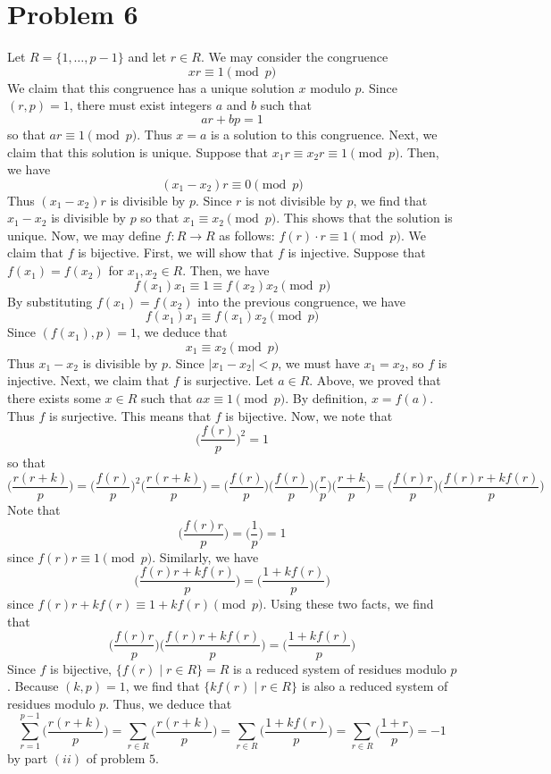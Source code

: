\documentclass[12pt]{article}
\begin{document}
\section*{Problem 6}
Let $R = \{1,\ldots, p - 1\}$ and let $r \in R$. We may consider the congruence
\[
xr \equiv 1 \pmod{p}
\] We claim that this congruence has a unique solution $x$ modulo $p$. Since $(r,p) = 1$, there must exist integers $a$ and $b$ such that
\[
ar + bp = 1
\] so that $ar \equiv 1 \pmod{p}$. Thus $x = a$ is a solution to this congruence. Next, we claim that this solution is unique. Suppose that $x_1r \equiv x_2r \equiv 1 \pmod{p}$. Then, we have
\[
(x_1-x_2)r \equiv 0 \pmod{p}
\] Thus $(x_1 - x_2)r$ is divisible by $p$. Since $r$ is not divisible by $p$, we find that $x_1 - x_2$ is divisible by $p$ so that $x_1 \equiv x_2 \pmod{p}$. This shows that the solution is unique. Now, we may define $f: R \rightarrow R$ as follows: $f(r) \cdot r \equiv 1 \pmod{p}$. We claim that $f$ is bijective. First, we will show that $f$ is injective. Suppose that $f(x_1) = f(x_2)$ for $x_1,x_2 \in R$. Then, we have
\[
f(x_1)x_1 \equiv 1 \equiv f(x_2)x_2 \pmod{p}
\] By substituting $f(x_1) = f(x_2)$ into the previous congruence, we have
\[
f(x_1)x_1 \equiv f(x_1)x_2 \pmod{p}
\] Since $(f(x_1), p) = 1$, we deduce that
\[
x_1 \equiv x_2 \pmod{p}
\] Thus $x_1 - x_2$ is divisible by $p$. Since $\vert x_1 - x_2 \vert < p$, we must have $x_1 = x_2$, so $f$ is injective. Next, we claim that $f$ is surjective. Let $a \in R$. Above, we proved that there exists some $x \in R$ such that $ax \equiv 1 \pmod{p}$. By definition, $x = f(a)$. Thus $f$ is surjective. This means that $f$ is bijective.
Now, we note that
\[
\bigg(\frac{f(r)}{p} \bigg)^2 = 1
\] so that
\[
\bigg(\frac{r(r+k)}{p}\bigg) = \bigg(\frac{f(r)}{p} \bigg)^2 \bigg(\frac{r(r+k)}{p}\bigg) =  \bigg(\frac{f(r)}{p} \bigg) \bigg(\frac{f(r)}{p} \bigg) \bigg(\frac{r}{p}\bigg) \bigg(\frac{r+k}{p}\bigg) = \bigg(\frac{f(r)r}{p}\bigg)\bigg(\frac{f(r)r + kf(r)}{p}\bigg)
\] Note that
\[
 \bigg(\frac{f(r)r}{p}\bigg) = \bigg(\frac{1}{p}\bigg) = 1
\] since $f(r)r \equiv 1 \pmod{p}$. Similarly, we have
\[
\bigg(\frac{f(r)r + kf(r)}{p}\bigg) = \bigg(\frac{1 + kf(r)}{p}\bigg)
\] since $f(r)r + kf(r) \equiv 1 + kf(r) \pmod{p}$. Using these two facts, we find that 
\[
\bigg(\frac{f(r)r}{p}\bigg)\bigg(\frac{f(r)r + kf(r)}{p}\bigg) = \bigg(\frac{1 + kf(r)}{p}\bigg) 
\] Since $f$ is bijective, $\{f(r) \mid r \in R\} = R$ is a reduced system of residues modulo $p$. Because $(k,p) = 1$, we find that $\{kf(r) \mid r\in R\}$ is also a reduced system of residues modulo $p$. Thus, we deduce that
\[
\sum_{r=1}^{p-1} \bigg(\frac{r(r+k)}{p}\bigg) = \sum_{r \in R} \bigg( \frac{r(r+k)}{p} \bigg) = \sum_{r \in R} \bigg( \frac{1+kf(r)}{p} \bigg) = \sum_{r \in R} \bigg( \frac{1+r}{p} \bigg) = -1
\] by part $(ii)$ of problem $5$.
\end{document}
